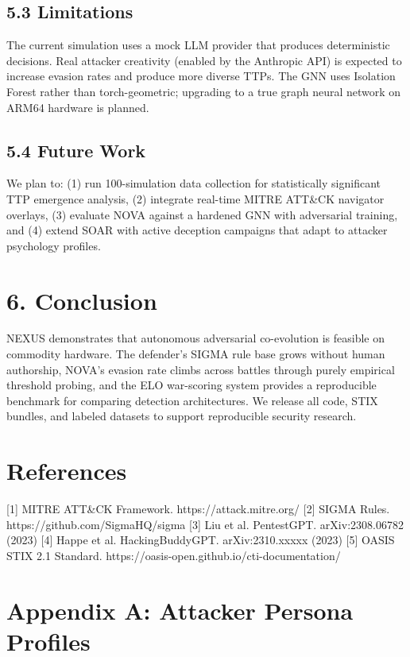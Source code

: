 \documentclass{article}
\begin{document}
\subsection{5.3 Limitations}
The current simulation uses a mock LLM provider that produces deterministic decisions. Real attacker creativity (enabled by the Anthropic API) is expected to increase evasion rates and produce more diverse TTPs. The GNN uses Isolation Forest rather than torch-geometric; upgrading to a true graph neural network on ARM64 hardware is planned.


\subsection{5.4 Future Work}
We plan to: (1) run 100-simulation data collection for statistically significant TTP emergence analysis, (2) integrate real-time MITRE ATT\&CK navigator overlays, (3) evaluate NOVA against a hardened GNN with adversarial training, and (4) extend SOAR with active deception campaigns that adapt to attacker psychology profiles.



\section{6. Conclusion}

NEXUS demonstrates that autonomous adversarial co-evolution is feasible on commodity hardware. The defender's SIGMA rule base grows without human authorship, NOVA's evasion rate climbs across battles through purely empirical threshold probing, and the ELO war-scoring system provides a reproducible benchmark for comparing detection architectures. We release all code, STIX bundles, and labeled datasets to support reproducible security research.



\section{References}

[1] MITRE ATT\&CK Framework. https://attack.mitre.org/
[2] SIGMA Rules. https://github.com/SigmaHQ/sigma
[3] Liu et al. PentestGPT. arXiv:2308.06782 (2023)
[4] Happe et al. HackingBuddyGPT. arXiv:2310.xxxxx (2023)
[5] OASIS STIX 2.1 Standard. https://oasis-open.github.io/cti-documentation/



\section{Appendix A: Attacker Persona Profiles}
\end{document}
